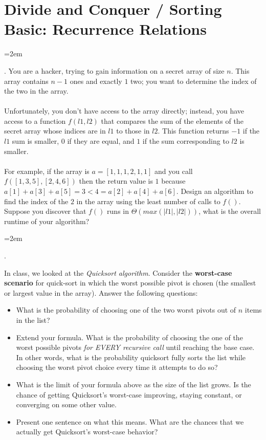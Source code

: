 \documentclass[12pt]{article}
\def\homework{Divide and Conquer / Sorting Basic: Recurrence Relations}
\newcounter{quesnum}
\newcommand{\question}[2][??]{
\begin{list}{\labelitemi}{\leftmargin=2em}
\item [\arabic{quesnum}.] {} {#2}
\end{list}
\addtocounter{quesnum}{1}
}
\begin{document}
\section*{\homework}


\question[3]{
You are a hacker, trying to gain information on a secret array of size $n$. This array contains $n-1$ ones and exactly $1$ two; you want to determine the index of the two in the array.\\
\\
Unfortunately, you don't have access to the array directly; instead, you have access to a function $f(l1, l2)$ that compares the sum of the elements of the secret array whose indices are in $l1$ to those in $l2$. This function returns $-1$ if the $l1$ sum is smaller, $0$ if they are equal, and $1$ if the sum corresponding to $l2$ is smaller.\\
\\
For example, if the array is $a=[1,1,1,2,1,1]$ and you call $f([1,3,5],[2,4,6])$ then the return value is $1$ because $a[1]+a[3]+a[5]=3<4=a[2]+a[4]+a[6]$. Design an algorithm to find the index of the $2$ in the array using the least number of calls to $f()$. Suppose you discover that $f()$ runs in $\Theta(max(|l1|,|l2|))$, what is the overall runtime of your algorithm? 
}

\vspace{12pt}

\question[3]{
In class, we looked at the \emph{Quicksort algorithm}. Consider the \textbf{worst-case scenario} for quick-sort in which the worst possible pivot is chosen (the smallest or largest value in the array). Answer the following questions:

\begin{itemize}
\item What is the probability of choosing one of the two worst pivots out of $n$ items in the list?
\item Extend your formula. What is the probability of choosing the one of the worst possible pivots \emph{for EVERY recursive call} until reaching the base case. In other words, what is the probability quicksort fully sorts the list while choosing the worst pivot choice every time it attempts to do so?
\item What is the limit of your formula above as the size of the list grows. Is the chance of getting Quicksort's worst-case improving, staying constant, or converging on some other value.
\item Present one sentence on what this means. What are the chances that we actually get Quicksort's worst-case behavior?
\end{itemize}
}
\end{document}
